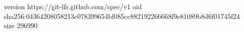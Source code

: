 version https://git-lfs.github.com/spec/v1
oid sha256:04364208058213c078399654bf085cc882192266668f9e81089b8d6f01745f24
size 296990

